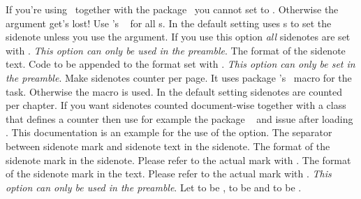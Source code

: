 \documentclass[load-preamble+]{cnltx-doc}
\begin{document}
\begin{options}
    If you're using \snotez\ together with the 
    package~\cite{pkg:fnpct} you cannot set  to .
    Otherwise the  argument get's lost!
    Use 's ~\cite{pkg:marginnote} for all
    s.  In the default setting  uses
    s to set the sidenote unless you use the 
    argument.  If you use this option \emph{all} sidenotes are set with
    .  \emph{This option can only be used in the preamble}.
    The format of the sidenote text.
  \Default
    Code to be appended to the format set with
    .
    \emph{This option can only be set in the preamble}.  Make sidenotes
    counter per page.  It uses package 's~\cite{pkg:perpage}
     macro for the task.  Otherwise the macro
     is used.  In the default setting sidenotes are counted 
    per chapter.  If you want sidenotes counted document-wise together with a
    class that defines a counter  then use for example the
    package ~\cite{pkg:chngcntr} and issue
     after loading \snotez.
    This documentation is an example for the use of the option.
    The separator between sidenote mark and sidenote text in the sidenote.
    The format of the sidenote mark in the sidenote.  Please refer to the
    actual mark with .
    The format of the sidenote mark in the text.  Please
    refer to the actual mark with .
    \emph{This option can only be used in the preamble}. Let  to be ,
     to be  and  to be
    .
\end{options}
\end{document}
